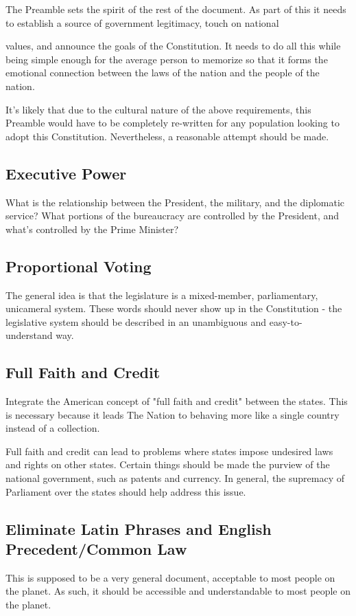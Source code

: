 \documentclass{article}
\newcommand{\nation}{The Nation}
\begin{document}
    The Preamble sets the spirit of the rest of the document. As part of this
    it needs to establish a source of government legitimacy, touch on national

    values, and announce the goals of the Constitution. It needs to do all this
    while being simple enough for the average person to memorize so that it
    forms the emotional connection between the laws of the nation and the people
    of the nation.

    It's likely that due to the cultural nature of the above requirements, this
    Preamble would have to be completely re-written for any population looking
    to adopt this Constitution. Nevertheless, a reasonable attempt should be
    made.

    \subsection*{Executive Power}

    What is the relationship between the President, the military, and the
    diplomatic service? What portions of the bureaucracy are controlled by the
    President, and what's controlled by the Prime Minister?

    \subsection*{Proportional Voting}

    The general idea is that the legislature is a mixed-member, parliamentary,
    unicameral system. These words should never show up in the Constitution -
    the legislative system should be described in an unambiguous and easy-to-
    understand way.

    \subsection*{Full Faith and Credit}

    Integrate the American concept of "full faith and credit" between the
    states. This is necessary because it leads \nation{} to behaving more like
    a single country instead of a collection.

    Full faith and credit can lead to problems where states impose undesired
    laws and rights on other states. Certain things should be made the purview
    of the national government, such as patents and currency. In general, the
    supremacy of Parliament over the states should help address this issue.

    \subsection*{Eliminate Latin Phrases and English Precedent/Common Law}

    This is supposed to be a very general document, acceptable to most people
    on the planet. As such, it should be accessible and understandable to most
    people on the planet.
\end{document}
